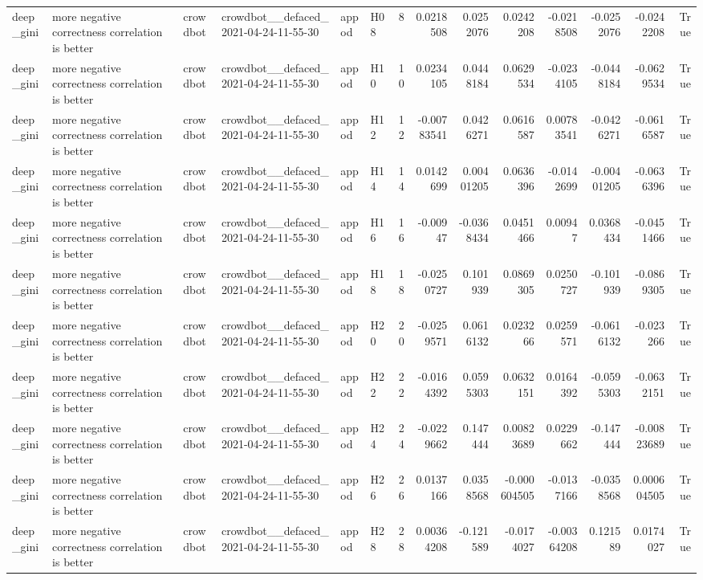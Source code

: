 \begin{longtable}{llllllrrrrrrrr}
deep\_gini & more negative correctness correlation is better & crowdbot & crowdbot\_\_defaced\_2021-04-24-11-55-30 & appod & H08 & 8 & 0.0218508 & 0.0252076 & 0.0242208 & -0.0218508 & -0.0252076 & -0.0242208 & True \\
deep\_gini & more negative correctness correlation is better & crowdbot & crowdbot\_\_defaced\_2021-04-24-11-55-30 & appod & H10 & 10 & 0.0234105 & 0.0448184 & 0.0629534 & -0.0234105 & -0.0448184 & -0.0629534 & True \\
deep\_gini & more negative correctness correlation is better & crowdbot & crowdbot\_\_defaced\_2021-04-24-11-55-30 & appod & H12 & 12 & -0.00783541 & 0.0426271 & 0.0616587 & 0.00783541 & -0.0426271 & -0.0616587 & True \\
deep\_gini & more negative correctness correlation is better & crowdbot & crowdbot\_\_defaced\_2021-04-24-11-55-30 & appod & H14 & 14 & 0.0142699 & 0.00401205 & 0.0636396 & -0.0142699 & -0.00401205 & -0.0636396 & True \\
deep\_gini & more negative correctness correlation is better & crowdbot & crowdbot\_\_defaced\_2021-04-24-11-55-30 & appod & H16 & 16 & -0.00947 & -0.0368434 & 0.0451466 & 0.00947 & 0.0368434 & -0.0451466 & True \\
deep\_gini & more negative correctness correlation is better & crowdbot & crowdbot\_\_defaced\_2021-04-24-11-55-30 & appod & H18 & 18 & -0.0250727 & 0.101939 & 0.0869305 & 0.0250727 & -0.101939 & -0.0869305 & True \\
deep\_gini & more negative correctness correlation is better & crowdbot & crowdbot\_\_defaced\_2021-04-24-11-55-30 & appod & H20 & 20 & -0.0259571 & 0.0616132 & 0.023266 & 0.0259571 & -0.0616132 & -0.023266 & True \\
deep\_gini & more negative correctness correlation is better & crowdbot & crowdbot\_\_defaced\_2021-04-24-11-55-30 & appod & H22 & 22 & -0.0164392 & 0.0595303 & 0.0632151 & 0.0164392 & -0.0595303 & -0.0632151 & True \\
deep\_gini & more negative correctness correlation is better & crowdbot & crowdbot\_\_defaced\_2021-04-24-11-55-30 & appod & H24 & 24 & -0.0229662 & 0.147444 & 0.00823689 & 0.0229662 & -0.147444 & -0.00823689 & True \\
deep\_gini & more negative correctness correlation is better & crowdbot & crowdbot\_\_defaced\_2021-04-24-11-55-30 & appod & H26 & 26 & 0.0137166 & 0.0358568 & -0.000604505 & -0.0137166 & -0.0358568 & 0.000604505 & True \\
deep\_gini & more negative correctness correlation is better & crowdbot & crowdbot\_\_defaced\_2021-04-24-11-55-30 & appod & H28 & 28 & 0.00364208 & -0.121589 & -0.0174027 & -0.00364208 & 0.121589 & 0.0174027 & True \\

\end{longtable}
